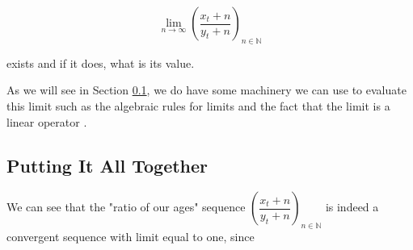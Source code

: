 \documentclass[11pt, oneside]{article}          %
\theoremstyle{definition}
\begin{document}
\bigskip
\begin{equation*}
\lim_{n \to \infty} \left (\dfrac{x_t +n}{y_t + n}\right )_{n \in \mathbb{N}}
\end{equation*}

\bigskip
\noindent
exists and if it does, what is its value.


\bigskip
\noindent
As we will see in Section \ref{subsec:putting_it_all_together},
we do have some machinery we can use to evaluate this limit such
as the algebraic rules for limits \cite{properties_of_limits} and
the fact that the limit is a linear operator \cite{fa_mit}.

\subsection{Putting It All Together}
\label{subsec:putting_it_all_together}
We can see that the "ratio of our ages" sequence 
$\left (\dfrac{x_t +n}{y_t + n}\right )_{n \in \mathbb{N}}$ 
is indeed a convergent sequence with limit equal to
one, since
\end{document}
